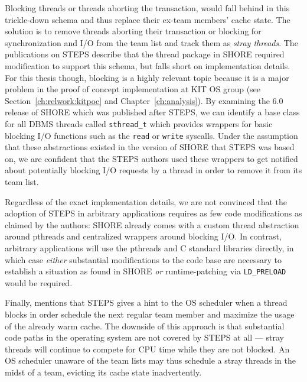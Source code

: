 \documentclass[12pt,a4paper]{book}
\begin{document}
Blocking threads or threads aborting the transaction, would fall behind in this trickle-down schema and thus replace their ex-team members' cache state.
The solution is to remove threads aborting their transaction or blocking for synchronization and I/O from the team list and track them as \emph{stray threads}.
The publications on STEPS describe that the thread package in SHORE required modification to support this schema, but falls short on implementation details.
For this thesis though, blocking is a highly relevant topic because it is a major problem in the proof of concept implementation at KIT OS group (see Section~\ref{ch:relwork:kitpoc} and Chapter~\ref{ch:analysis}).
By examining the 6.0 release of SHORE which was published after STEPS, we can identify a base class for all DBMS threads called \texttt{sthread\_t} which provides wrappers for basic blocking I/O functions such as the \texttt{read} or \texttt{write} syscalls.
Under the assumption that these abstractions existed in the version of SHORE that STEPS was based on, we are confident that the STEPS authors used these wrappers to get notified about potentially blocking I/O requests by a thread in order to remove it from its team list.~\cite{shoreRelease}

Regardless of the exact implementation details, we are not convinced that the adoption of STEPS in arbitrary applications requires as few code modifications as claimed by the authors:
SHORE already comes with a custom thread abstraction around pthreads and centralized wrappers around blocking I/O.
In contrast, arbitrary applications will use the pthreads and C standard libraries directly, in which case
\emph{either} substantial modifications to the code base are necessary to establish a situation as found in SHORE
\emph{or} runtime-patching via \texttt{LD\_PRELOAD} would be required.

Finally, \citeauthor*{steps} mentions that STEPS gives a hint to the OS scheduler when a thread blocks in order schedule the next regular team member and maximize the usage of the already warm cache.
The downside of this approach is that substantial  code paths in the operating system are not covered by STEPS at all
--- stray threads will continue to compete for CPU time while they are not blocked.
An OS scheduler unaware of the team lists may thus schedule a stray threads in the midst of a team, evicting its cache state inadvertently.
\end{document}
